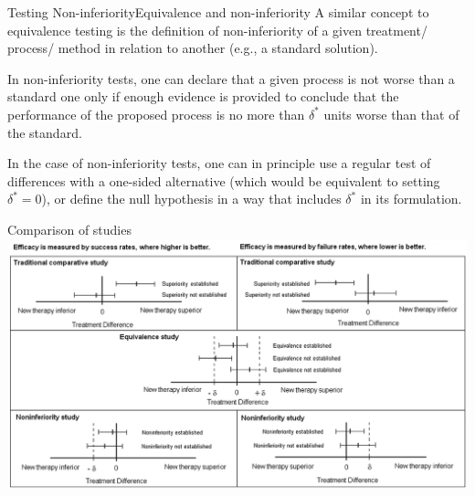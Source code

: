 \begin{frame}{Testing Non-inferiority}{Equivalence and non-inferiority}
A similar concept to equivalence testing is the definition of non-inferiority of a given treatment/ process/ method in relation to another (e.g., a standard solution).
\bigskip

In non-inferiority tests, one can declare that a given process is not worse than a standard one only if enough evidence is provided to conclude that the performance of the proposed process is no more than $\delta^*$ units worse than that of the standard.
\bigskip

In the case of non-inferiority tests, one can in principle use a regular test of differences with a one-sided alternative (which would be equivalent to setting $\delta^* = 0$), or define the null hypothesis in a way that includes $\delta^*$ in its formulation.
\end{frame}


\begin{frame}{Comparison of studies}
\includegraphics[width=\textwidth]{../img/TOST.png}
\end{frame}


